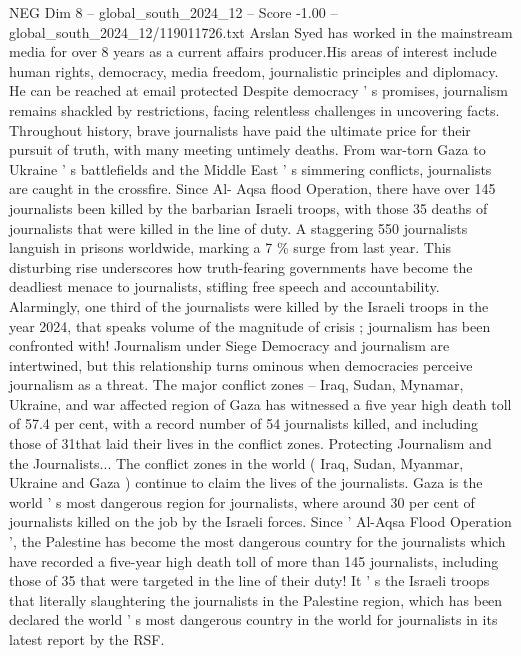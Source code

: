 \begin{textsample}{NEG Dim 8 – global\_south\_2024\_12 – Score -1.00 – global\_south\_2024\_12/119011726.txt}  \label{ex:f8_neg_379}
Arslan Syed has worked in the mainstream media for over 8 years as a current affairs producer.His areas of interest include human rights, democracy, media freedom, journalistic principles and diplomacy.
He can be reached at email protected Despite democracy ' s promises, journalism remains shackled by restrictions, facing relentless challenges in uncovering facts.
Throughout history, brave journalists have paid the ultimate price for their pursuit of truth, with many meeting untimely deaths.
From war-torn Gaza to Ukraine ' s battlefields and the Middle East ' s simmering conflicts, journalists are caught in the crossfire.
Since Al- Aqsa flood Operation, there have over 145 journalists been killed by the barbarian Israeli troops, with those 35 deaths of journalists that were killed in the line of duty.
A staggering 550 journalists languish in prisons worldwide, marking a 7 \% surge from last year.
This disturbing rise underscores how truth-fearing governments have become the deadliest menace to journalists, stifling free speech and accountability.
Alarmingly, one third of the journalists were killed by the Israeli troops in the year 2024, that speaks volume of the magnitude of crisis ; journalism has been confronted with!
Journalism under Siege Democracy and journalism are intertwined, but this relationship turns ominous when democracies perceive journalism as a threat.
The major conflict zones -- Iraq, Sudan, Mynamar, Ukraine, and war affected region of Gaza has witnessed a five year high death toll of 57.4 per cent, with a record number of 54 journalists killed, and including those of 31that laid their lives in the conflict zones.
Protecting Journalism and the Journalists...
The conflict zones in the world ( Iraq, Sudan, Myanmar, Ukraine and Gaza ) continue to claim the lives of the journalists.
Gaza is the world ' s most dangerous region for journalists, where around 30 per cent of journalists killed on the job by the Israeli forces.
Since ' Al-Aqsa Flood Operation ', the Palestine has become the most dangerous country for the journalists which have recorded a five-year high death toll of more than 145 journalists, including those of 35 that were targeted in the line of their duty!
It ' s the Israeli troops that literally slaughtering the journalists in the Palestine region, which has been declared the world ' s most dangerous country in the world for journalists in its latest report by the RSF.

\end{textsample}
